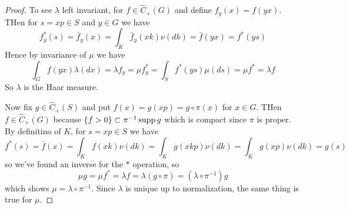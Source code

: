 \begin{proof}
  To see $\lambda$ left invariant, for $f \in \hat{C}_+(G)$ and define
  $f_y(x) = f(yx)$. THen for $s = xp \in S$ and $y \in G$ we have
  \[
    f^*_y(s) = \bar{f}_y(x)
    = \int_K \bar{f}_y(xk) \nu(dk)
    = \bar{f}(yx)
    = f^*(ys)
  \]
  Hence by invariance of $\mu$ we have
  \[
    \int_G f(yx) \lambda(dx) = \lambda f_y = \mu f_y^* = \int_S f^*(ys) \mu(ds) = \mu f^* = \lambda f
  \]
  So $\lambda$ is the Haar measure.

  Now fix $g \in \hat{C}_+(S)$ and put $f(x) = g(xp) = g \circ \pi(x)$ for $x \in G$.
  THen $f \in \hat{C}_+(G)$ because $\{f > 0\} \subset \pi^{-1} \operatorname{supp} g$
  which is compact since $\pi$ is proper. By definitino of $K$,
  for $s = xp \in S$ we have
  \[
    f^*(s) = \bar{f}(x) = \int_K f(xk) \nu(dk)
    = \int_K g(xkp) \nu(dk)
    = \int_K g(xp) \nu(dk)
    = g(s)
  \]
  so we've found an inverse for the $*$ operation, so
  \[
    \mu g = \mu f^* = \lambda f = \lambda(g \circ \pi) = (\lambda \circ \pi^{-1}) g
  \]
  which shows $\mu = \lambda \circ \pi^{-1}$. Since $\lambda$ is unique up to
  normalization, the same thing is true for $\mu$.
\end{proof}
